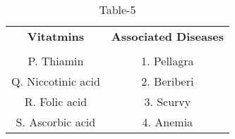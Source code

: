 \begin{table}[htbp]
  \centering
  \caption{Table-5}
  \label{table5}
  \begin{tabular}{cc}
  \textbf{Vitatmins} & \textbf{Associated Diseases} \\ \\
    P. Thiamin & 1. Pellagra \\
    Q. Niccotinic acid & 2. Beriberi\\
    R. Folic acid & 3. Scurvy \\
    S. Ascorbic acid & 4. Anemia \\
  \end{tabular}
\end{table}
